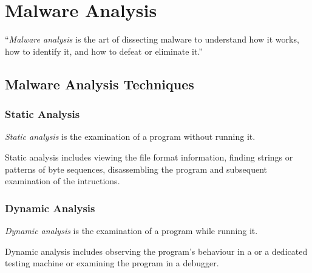 \chapter{Malware Analysis} \label{chap:analysis}

\begin{definition}
\enquote{\emph{Malware analysis} is the art of dissecting malware to understand how it
works, how to identify it, and how to defeat or eliminate it.} \cite[]{sikorski12}
\end{definition} 

\section{Malware Analysis Techniques}

\subsection*{Static Analysis}

\begin{definition}
\emph{Static analysis} is the examination of a program without running it. \cite[]{sikorski12}
\end{definition} 

Static analysis includes \eg{} viewing the file format information, finding strings or patterns of byte sequences, disassembling the program and subsequent examination of the intructions.

\subsection*{Dynamic Analysis}

\begin{definition}
\emph{Dynamic analysis} is the examination of a program while running it. \cite[]{sikorski12}
\end{definition}

Dynamic analysis includes \eg{} observing the program's behaviour in a \VM{} or a dedicated testing machine or examining the program in a debugger.
